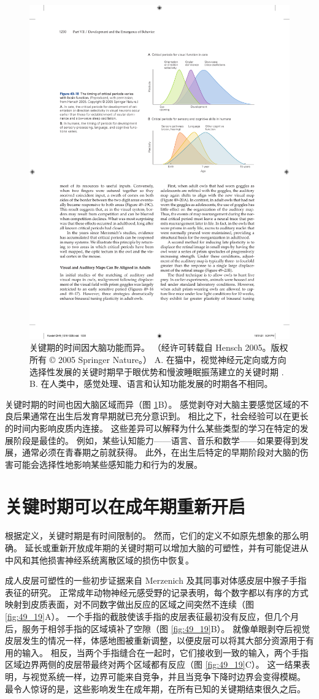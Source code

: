 \begin{figure}[htbp]
	\centering
	\includegraphics[width=0.6\linewidth]{chap49/fig_49_18}
	\caption{关键期的时间因大脑功能而异。 （经许可转载自 Hensch 2005。版权所有 © 2005 Springer Nature。） A. 在猫中，视觉神经元定向或方向选择性发展的关键时期早于眼优势和慢波睡眠振荡建立的关键时期 . B. 在人类中，感觉处理、语言和认知功能发展的时期各不相同。}
	\label{fig:49_18}
\end{figure}

关键时期的时间也因大脑区域而异（图 \ref{fig:49_18}B）。 感觉剥夺对大脑主要感觉区域的不良后果通常在出生后发育早期就已充分意识到。 相比之下，社会经验可以在更长的时间内影响皮质内连接。 这些差异可以解释为什么某些类型的学习在特定的发展阶段是最佳的。 例如，某些认知能力——语言、音乐和数学——如果要得到发展，通常必须在青春期之前就获得。 此外，在出生后特定的早期阶段对大脑的伤害可能会选择性地影响某些感知能力和行为的发展。


\section{关键时期可以在成年期重新开启}
根据定义，关键时期是有时间限制的。 然而，它们的定义不如原先想象的那么明确。 延长或重新开放成年期的关键时期可以增加大脑的可塑性，并有可能促进从中风和其他损害神经系统离散区域的损伤中恢复。

成人皮层可塑性的一些初步证据来自 Merzenich 及其同事对体感皮层中猴子手指表征的研究。 
正常成年动物神经元感受野的记录表明，每个数字都以有序的方式映射到皮质表面，对不同数字做出反应的区域之间突然不连续（图 \ref{fig:49_19}A）。 
一个手指的截肢使该手指的皮层表征最初没有反应，但几个月后，服务于相邻手指的区域填补了空隙（图 \ref{fig:49_19}B）。 就像单眼剥夺后视觉皮层发生的情况一样，体感地图被重新调整，以便皮层可以将其大部分资源用于有用的输入。 相反，当两个手指缝合在一起时，它们接收到一致的输入，两个手指区域边界两侧的皮层带最终对两个区域都有反应（图 \ref{fig:49_19}C）。 这一结果表明，与视觉系统一样，边界可能来自竞争，并且当竞争下降时边界会变得模糊。 最令人惊讶的是，这些影响发生在成年期，在所有已知的关键期结束很久之后。



